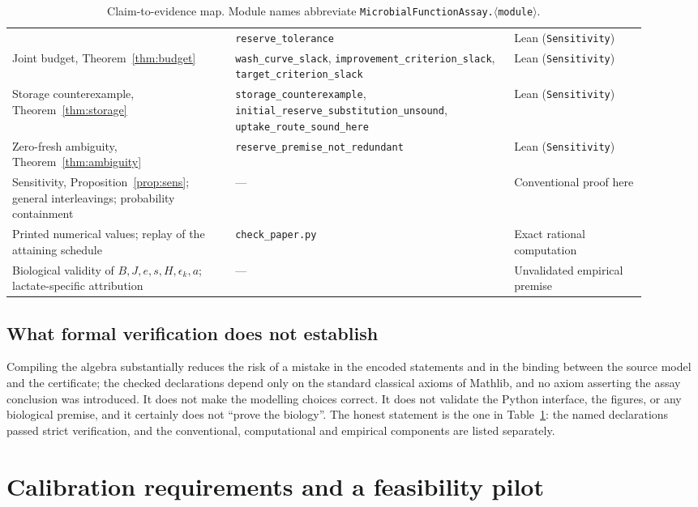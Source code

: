 \documentclass[11pt]{article}
\theoremstyle{plain}
\theoremstyle{definition}
\theoremstyle{remark}
\begin{document}
\begin{table}[t]
\begin{tabular}{>{\raggedright\arraybackslash}p{0.32\linewidth}%
                >{\raggedright\arraybackslash}p{0.40\linewidth}%
                >{\raggedright\arraybackslash}p{0.19\linewidth}}
 & \texttt{reserve\_tolerance} & Lean (\texttt{Sensitivity})\\
Joint budget, Theorem~\ref{thm:budget}
 & \texttt{wash\_curve\_slack},
   \texttt{improvement\_criterion\_slack},
   \texttt{target\_criterion\_slack} & Lean (\texttt{Sensitivity})\\
Storage counterexample, Theorem~\ref{thm:storage}
 & \texttt{storage\_counterexample},
   \texttt{initial\_reserve\_substitution\_unsound},
   \texttt{uptake\_route\_sound\_here} & Lean (\texttt{Sensitivity})\\
Zero-fresh ambiguity, Theorem~\ref{thm:ambiguity}
 & \texttt{reserve\_premise\_not\_redundant} & Lean (\texttt{Sensitivity})\\
Sensitivity, Proposition~\ref{prop:sens};
 general interleavings; probability containment
 & --- & Conventional proof here\\
Printed numerical values; replay of the attaining schedule
 & \texttt{check\_paper.py} & Exact rational computation\\
Biological validity of $B,J,e,s,H,\epsilon_k,a$; lactate-specific attribution
 & --- & Unvalidated empirical premise\\
\bottomrule
\end{tabular}
\caption{Claim-to-evidence map. Module names abbreviate
\texttt{MicrobialFunctionAssay.$\langle$module$\rangle$}.}
\label{tab:claims}
\end{table}

\subsection{What formal verification does not establish}

Compiling the algebra substantially reduces the risk of a mistake in the
encoded statements and in the binding between the source model and the
certificate; the checked declarations depend only on the standard classical
axioms of Mathlib, and no axiom asserting the assay conclusion was introduced.
It does not make the modelling choices correct. It does not validate the
Python interface, the figures, or any biological premise, and it certainly
does not ``prove the biology''. The honest statement is the one in
Table~\ref{tab:claims}: the named declarations passed strict verification,
and the conventional, computational and empirical components are listed
separately.

\section{Calibration requirements and a feasibility pilot}\label{sec:pilot}
\end{document}
